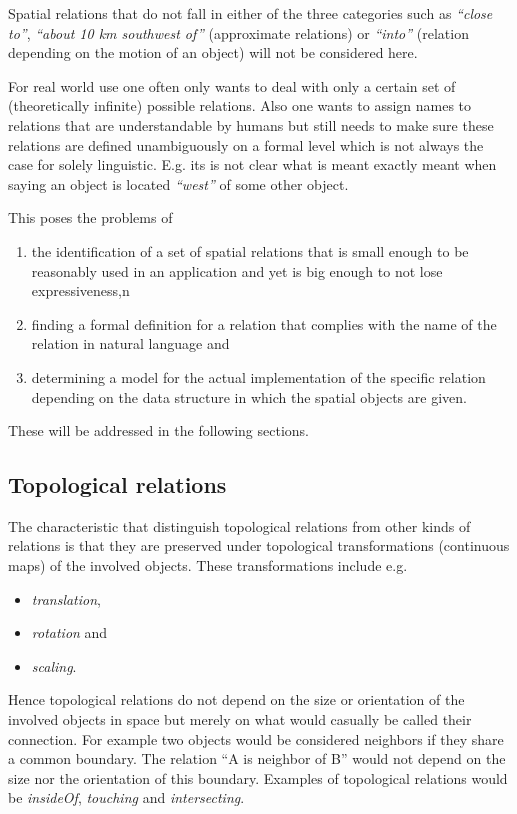 \documentclass[paper=a4, fontsize=11pt]{scrartcl} %
\numberwithin{equation}{section} %
\numberwithin{figure}{section} %
\numberwithin{table}{section} %
\begin{document}
Spatial relations that do not fall in either of the three categories such as \emph{``close to''}, \emph{``about 10 km southwest of''} (approximate relations) or \emph{``into''} (relation depending on the motion of an object) will not be considered here.

For real world use one often only wants to deal with only a certain set of (theoretically infinite) possible relations. Also one wants to assign names to relations that are understandable by humans but still needs to make sure these relations are defined unambiguously on a formal level which is not always the case for solely linguistic. E.g. its is not clear what is meant exactly meant when saying an object is located \emph{``west''} of some other object.

This poses the problems of 
\begin{enumerate}
\item the identification of a set of spatial relations that is small enough to be reasonably used in an application and yet is big enough to not lose expressiveness,n
\item finding a formal definition for a relation that complies with the name of the relation in natural language and
\item determining a model for the actual implementation of the specific relation depending on the data structure in which the spatial objects are given. 
\end{enumerate}

These will be addressed in the following sections.


\subsection{Topological relations}\label{sec:topol-relat-1}
The characteristic that distinguish topological relations from other kinds of relations is that they are preserved under topological transformations (continuous maps) of the involved objects. These transformations include e.g.
\begin{itemize}
\item \emph{translation},
\item \emph{rotation} and
\item \emph{scaling}.
\end{itemize}
Hence topological relations do not depend on the size or orientation of the involved objects in space but merely on what would casually be called their connection. For example two objects would be considered neighbors if they share a common boundary. The relation ``A is neighbor of B'' would not depend on the size nor the orientation of this boundary. Examples of topological relations would be \emph{insideOf}, \emph{touching} and  \emph{intersecting}.
\end{document}
